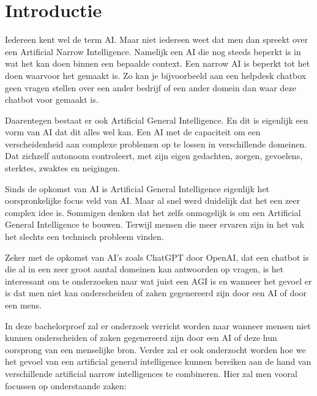 
\section{Introductie} %
\label{sec:introductie}

Iedereen kent wel de term AI. Maar niet iedereen weet dat men dan spreekt over een Artificial Narrow Intelligence. Namelijk een AI die nog steeds beperkt is in wat het kan doen binnen een bepaalde context. Een narrow AI is beperkt tot het doen waarvoor het gemaakt is. Zo kan je bijvoorbeeld aan een helpdesk chatbox geen vragen stellen over een ander bedrijf of een ander domein dan waar deze chatbot voor gemaakt is. \linebreak

Daarentegen bestaat er ook Artificial General Intelligence. En dit is eigenlijk een vorm van AI dat dit alles wel kan. Een AI met de capaciteit om een verscheidenheid aan complexe problemen op te lossen in verschillende domeinen. Dat zichzelf autonoom controleert, met zijn eigen gedachten, zorgen, gevoelens, sterktes, zwaktes en neigingen. \newpage

Sinds de opkomst van AI is Artificial General Intelligence eigenlijk het oorspronkelijke focus veld van AI. Maar al snel werd duidelijk dat het een zeer complex idee is. Sommigen denken dat het zelfs onmogelijk is om een Artificial General Intelligence te bouwen. Terwijl mensen die meer ervaren zijn in het vak het slechts een technisch probleem vinden. \linebreak

Zeker met de opkomst van AI's zoals ChatGPT door \hfill \break OpenAI, dat een chatbot is die al in een zeer groot aantal domeinen kan antwoorden op vragen, is het interessant om te onderzoeken naar wat juist een AGI is en wanneer het gevoel er is dat men niet kan onderscheiden of zaken gegenereerd zijn door een AI of door een mens. \linebreak

In deze bachelorproef zal er onderzoek verricht worden naar wanneer mensen niet kunnen onderscheiden of zaken gegenereerd zijn door een AI of deze hun oorsprong van een menselijke bron. Verder zal er ook onderzocht worden hoe we het gevoel van een artificial general intelligence kunnen bereiken aan de hand van verschillende artificial narrow intelligences te combineren. Hier zal men vooral focussen op onderstaande zaken: \linebreak

